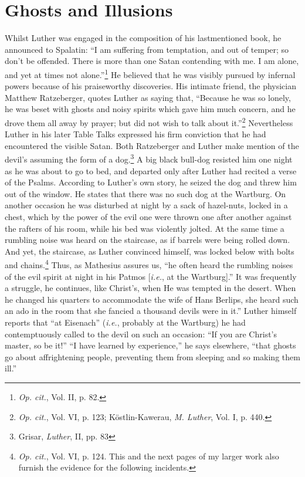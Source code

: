\section{Ghosts and Illusions}

Whilst Luther was engaged in the composition of his lastmentioned book,
he announced to Spalatin: “I am suffering from
temptation, and out of temper; so don’t be offended. There is more
than one Satan contending with me. I am alone, and yet at times not
alone.”\footnote{\textit{Op. cit.}, Vol. II, p. 82.}
He believed that he was visibly pursued by infernal powers
because of his praiseworthy discoveries. His intimate friend, the
physician Matthew Ratzeberger, quotes Luther as saying that, “Because he
was so lonely, he was beset with ghosts and noisy spirits
which gave him much concern, and he drove them all away by prayer;
but did not wish to talk about it.”\footnote{\textit{Op. cit.}, Vol. VI, p. 123; Köstlin-Kawerau, \textit{M. Luther}, Vol. I, p. 440.}
Nevertheless Luther in his later Table Talks expressed his firm
conviction that he had encountered the visible Satan. Both Ratzeberger
and Luther make mention of the devil’s assuming the form of
a dog.\footnote{Grisar, \textit{Luther}, II, pp. 83}
A big black bull-dog resisted him one night as he was about
to go to bed, and departed only after Luther had recited a verse of
the Psalms. According to Luther’s own story, he seized the dog
and threw him out of the window. He states that there was no such
dog at the Wartburg. On another occasion he was disturbed at night
by a sack of hazel-nuts, locked in a chest, which by the power of the
evil one were thrown one after another against the rafters of his room,
while his bed was violently jolted. At the same time a rumbling noise
was heard on the staircase, as if barrels were being rolled down. And
yet, the staircase, as Luther convinced himself, was locked below with
bolts and chains.\footnote
{\textit{Op. cit.}, Vol. VI, p. 124. This and the next pages of my larger work also furnish the
evidence for the following incidents.}
Thus, as Mathesius assures us, ``he often heard the
rumbling noises of the evil spirit at night in his Patmos [\textit{i.e.}, at the
Wartburg].'' It was frequently a struggle, he continues, like Christ’s,
when He was tempted in the desert. When he changed his quarters to
accommodate the wife of Hans Berlips, she heard such an ado in the
room that she fancied a thousand devils were in it.” Luther himself
reports that “at Eisenach” (\textit{i.e.}, probably at the Wartburg) he had
contemptuously called to the devil on such an occasion: “If you are
Christ’s master, so be it!” “I have learned by experience,” he says
elsewhere, “that ghosts go about affrightening people, preventing
them from sleeping and so making them ill.”

